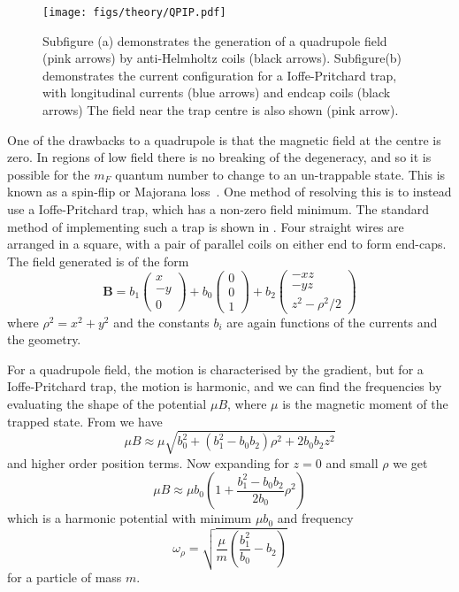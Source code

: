 \begin{figure}
  \centering
  \texttt{[image: figs/theory/QPIP.pdf]}
  \caption{Subfigure (a) demonstrates the generation of a quadrupole field
    (pink arrows) by
  anti-Helmholtz coils (black arrows). Subfigure(b) demonstrates the current
  configuration for a
  Ioffe-Pritchard trap, with longitudinal currents (blue arrows) and endcap
coils (black arrows) The field near the trap centre is also shown (pink arrow).
}
  \label{theory:fig:fields}
\end{figure}

One of the drawbacks to a quadrupole is that the magnetic field at the centre
is zero. In regions of low field there is no breaking of the degeneracy, and so
it is possible for the $m_F$ quantum number to change to an un-trappable state.
This is known as a spin-flip or Majorana loss~\cite{Brink2006}. One method of
resolving this is to instead use a Ioffe-Pritchard trap, which has a non-zero
field minimum. The standard method of implementing such a trap is shown in
. Four straight wires are arranged in a
square, with a pair of parallel coils on either end to form end-caps. The field
generated is of the form
%
\begin{equation}
  \mathbf{B} = b_1 \begin{pmatrix} x \\ -y \\ 0 \end{pmatrix}
  + b_0 \begin{pmatrix} 0 \\ 0 \\ 1 \end{pmatrix}
  + b_2 \begin{pmatrix} -xz \\ -yz \\ z^2 - \rho^2/2 \end{pmatrix}
  \label{theory:eqn:IP}
\end{equation}
%
where $\rho^2 = x^2 + y^2$ and the constants $b_i$ are again functions
of the currents and the geometry.

For a quadrupole field, the motion is characterised by the gradient, but for a
Ioffe-Pritchard trap, the motion is harmonic, and we can find the frequencies
by evaluating the shape of the potential $\mu B$, where $\mu$ is the magnetic
moment of the trapped state. From  we have
%
\begin{equation}
  \mu B \approx \mu \sqrt{b_0^2 + (b_1^2 -
  b_0b_2)\rho^2 + 2b_0b_2z^2}
\end{equation}
%
and higher order position terms. Now expanding for $z=0$ and small $\rho$ we get
%
\begin{equation}
  \mu B \approx \mu b_0\left(1 + \frac{b_1^2 -
    b_0b_2}{2b_0}\rho^2\right)
\end{equation}
%
which is a harmonic potential with minimum $\mu b_0$ and frequency
%
\begin{equation}
  \omega_\rho = \sqrt{\frac{\mu}{m}\left(\frac{b_1^2}{b_0}-b_2\right)}
\end{equation}
%
for a particle of mass $m$.


